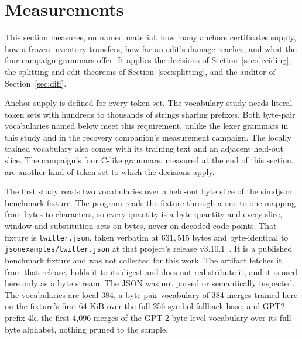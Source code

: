 \documentclass[11pt,a4paper]{article}
\theoremstyle{definition}
\theoremstyle{plain}
\newcommand{\code}[1]{\texttt{#1}}
\begin{document}
\section{Measurements}\label{sec:measurements}

This section measures, on named material, how many anchors certificates supply, how a frozen inventory transfers, how
far an edit's damage reaches, and what the four campaign grammars offer. It applies the decisions of
Section~\ref{sec:deciding}, the splitting and edit theorems of Section~\ref{sec:splitting}, and the auditor of
Section~\ref{sec:diff}.

Anchor supply is defined for every token set. The vocabulary study needs literal token sets with hundreds to thousands
of strings sharing prefixes. Both byte-pair vocabularies named below meet this requirement, unlike the lexer grammars in
this study and in the recovery companion's measurement campaign. The locally trained vocabulary also comes with its
training text and an adjacent held-out slice. The campaign's four C-like grammars, measured at the end of this section,
are another kind of token set to which the decisions apply.

The first study reads two vocabularies over a held-out byte slice of the simdjson benchmark fixture. The program reads
the fixture through a one-to-one mapping from bytes to characters, so every quantity is a byte quantity and every slice,
window and substitution acts on bytes, never on decoded code points. That fixture is \code{twitter.json}, taken verbatim
at $631{,}515$ bytes and byte-identical to \code{jsonexamples/\allowbreak twitter.json} at that project's release
v3.10.1~\citep{simdjsondata}. It is a published benchmark fixture and was not collected for this work. The artifact
fetches it from that release, holds it to its digest and does not redistribute it, and it is used here only as a byte
stream. The JSON was not parsed or semantically inspected. The vocabularies are local-384, a byte-pair vocabulary of 384
merges trained here on the fixture's first 64 KiB over the full 256-symbol fallback base, and GPT2-prefix-4k, the first
4{,}096 merges of the GPT-2 byte-level vocabulary over its full byte alphabet, nothing pruned to the sample.
\end{document}
